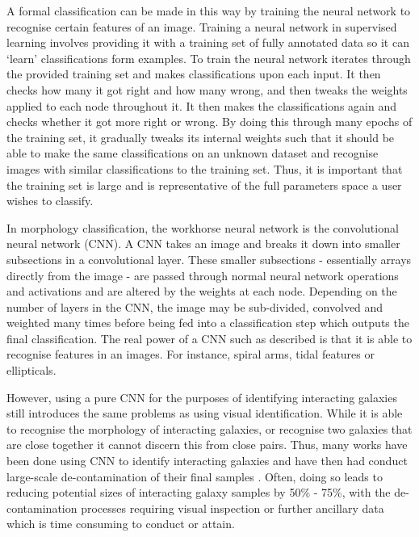 A formal classification can be made in this way by training the neural network to recognise certain features of an image. Training a neural network in supervised learning involves providing it with a training set of fully annotated data so it can `learn' classifications form examples. To train the neural network iterates through the provided training set and makes classifications upon each input. It then checks how many it got right and how many wrong, and then tweaks the weights applied to each node throughout it. It then makes the classifications again and checks whether it got more right or wrong. By doing this through many epochs of the training set, it gradually tweaks its internal weights such that it should be able to make the same classifications on an unknown dataset and recognise images with similar classifications to the training set. Thus, it is important that the training set is large and is representative of the full parameters space a user wishes to classify.

In morphology classification, the workhorse neural network is the convolutional neural network (CNN). A CNN takes an image and breaks it down into smaller subsections in a convolutional layer. These smaller subsections - essentially arrays directly from the image - are passed through normal neural network operations and activations and are altered by the weights at each node. Depending on the number of layers in the CNN, the image may be sub-divided, convolved and weighted many times before being fed into a classification step which outputs the final classification. The real power of a CNN such as described is that it is able to recognise features in an images. For instance, spiral arms, tidal features or ellipticals. 

However, using a pure CNN for the purposes of identifying interacting galaxies still introduces the same problems as using visual identification. While it is able to recognise the morphology of interacting galaxies, or recognise two galaxies that are close together it cannot discern this from close pairs. Thus, many works have been done using CNN to identify interacting galaxies and have then had conduct large-scale de-contamination of their final samples \citep{Papers removing contamination of interacting galaxies}. Often, doing so leads to reducing potential sizes of interacting galaxy samples by 50\% - 75\%, with the de-contamination processes requiring visual inspection or further ancillary data which is time consuming to conduct or attain.

